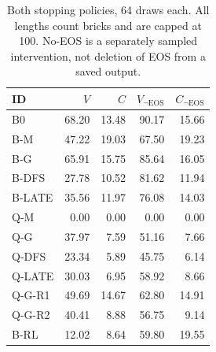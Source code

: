 \begin{table}[ht]\centering\small
\caption{Both stopping policies, 64 draws each. All lengths count bricks and are capped at 100. No-EOS is a separately sampled intervention, not deletion of EOS from a saved output.}
\label{tab:stopping}
\begin{tabular}{@{}lrrrr@{}}\toprule
ID & $V$ & $C$ & $V_{\neg\mathrm{EOS}}$ & $C_{\neg\mathrm{EOS}}$ \\ \midrule
B0 & 68.20 & 13.48 & 90.17 & 15.66 \\
B-M & 47.22 & 19.03 & 67.50 & 19.23 \\
B-G & 65.91 & 15.75 & 85.64 & 16.05 \\
B-DFS & 27.78 & 10.52 & 81.62 & 11.94 \\
B-LATE & 35.56 & 11.97 & 76.08 & 14.03 \\
Q-M & 0.00 & 0.00 & 0.00 & 0.00 \\
Q-G & 37.97 & 7.59 & 51.16 & 7.66 \\
Q-DFS & 23.34 & 5.89 & 45.75 & 6.14 \\
Q-LATE & 30.03 & 6.95 & 58.92 & 8.66 \\
Q-G-R1 & 49.69 & 14.67 & 62.80 & 14.91 \\
Q-G-R2 & 40.41 & 8.88 & 56.75 & 9.14 \\
B-RL & 12.02 & 8.64 & 59.80 & 19.55 \\
\bottomrule\end{tabular}\end{table}
